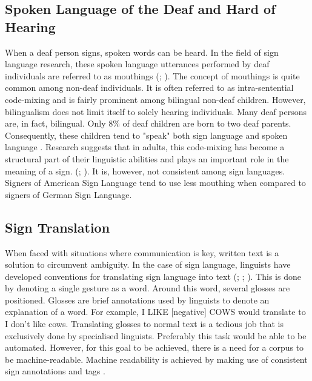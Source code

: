 \subsection{Spoken Language of the Deaf and Hard of Hearing}

When a deaf person signs, spoken words can be heard. In the field of sign language research, these spoken language utterances performed by deaf individuals are referred to as mouthings (\citealp{konradoffentliches}; \citealp{braem2001functions}). The concept of mouthings is quite common among non-deaf individuals. It is often referred to as intra-sentential code-mixing \cite{paradis2000early} and is fairly prominent among bilingual non-deaf children. However, bilingualism does not limit itself to solely hearing individuals. Many deaf persons are, in fact, bilingual. Only 8\% of deaf children are born to two deaf parents. Consequently, these children tend to "speak" both sign language and spoken language \cite{perniss2007}. Research suggests that in adults, this code-mixing has become a structural part of their linguistic abilities and plays an important role in the meaning of a sign. (\citealp{pfaff1979constraints};  \citealp{konradoffentliches}). It is, however, not consistent among sign languages. Signers of American Sign Language tend to use less mouthing when compared to signers of German Sign Language.

\subsection{Sign Translation}

When faced with situations where communication is key, written text is a solution to circumvent ambiguity. In the case of sign language, linguists have developed conventions for translating sign language into text (\citealp{konradoffentliches}; \citealp{aouiti2015arab}; \citealp{porta2014rule}). This is done by denoting a single gesture as a word. Around this word, several glosses are positioned.  Glosses are brief annotations used by linguists to denote an explanation of a word. For example, I LIKE [negative] COWS would translate to I don't like cows. Translating glosses to normal text is a tedious job that is exclusively done by specialised linguists. Preferably this task would be able to be automated. However, for this goal to be achieved, there is a need for a corpus to be machine-readable. Machine readability is achieved by making use of consistent sign annotations and tags \cite{johnston2008corpus}. 


